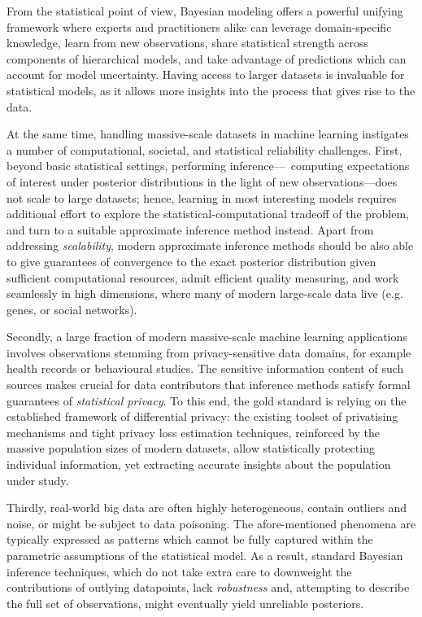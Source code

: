 From the statistical point of view, Bayesian modeling offers a powerful unifying framework where experts and practitioners alike can leverage domain-specific knowledge, learn from new observations, share statistical strength across components of hierarchical models, and take advantage of predictions which can account for model uncertainty. Having access to larger datasets is invaluable for statistical models, as it allows more insights into the process that gives rise to the data. 

At the same time, handling massive-scale datasets in machine learning instigates a number of computational, societal, and statistical reliability challenges. First, beyond basic statistical settings, performing inference---\ie~computing expectations of interest under posterior distributions in the light of new observations---does not scale to large datasets; hence, learning in most interesting models requires additional effort to explore the statistical-computational tradeoff of the problem, and turn to a suitable approximate inference method instead. Apart from addressing \emph{scalability}, modern approximate inference methods should be also able to give guarantees of convergence to the exact posterior distribution given sufficient computational resources, admit efficient quality measuring, and work seamlessly in high dimensions, where many of modern large-scale data live (e.g. genes, or social networks).

Secondly, a large fraction of modern massive-scale machine learning applications involves observations stemming from privacy-sensitive data domains, for example health records or behavioural studies. The sensitive information content of such sources makes crucial for data contributors that inference methods satisfy formal guarantees of \emph{statistical privacy}. To this end, the gold standard is relying on the established framework of differential privacy: the existing toolset of privatising mechanisms and tight privacy loss estimation techniques, reinforced by the massive population sizes of modern datasets, allow statistically protecting individual information, yet extracting accurate insights about the population under study.

Thirdly, real-world big data are often highly heterogeneous, contain outliers and noise, or might be subject to data poisoning. The afore-mentioned phenomena are typically expressed as patterns which cannot be fully captured within the parametric assumptions of the statistical model. As a result, standard Bayesian inference techniques, which do not take extra care to downweight the contributions of outlying datapoints, lack \emph{robustness} and, attempting to describe the full set of observations, might eventually yield unreliable posteriors. 

